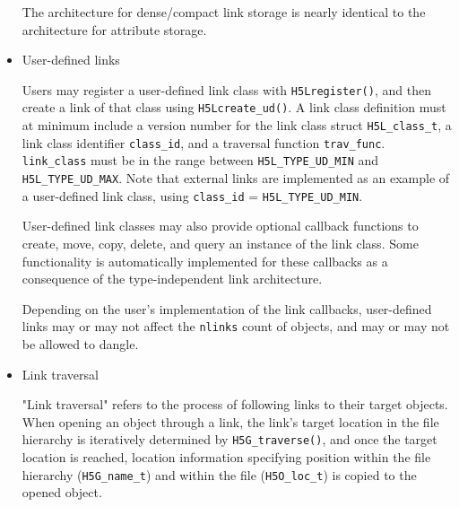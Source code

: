 \begin{itemize}

The architecture for dense/compact link storage is nearly identical to the architecture for attribute storage.

    \item User-defined links

Users may register a user-defined link class with \texttt{H5Lregister()}, and then create a link of that class using \texttt{H5Lcreate\_ud()}. A link class definition must at minimum include a version number for the link class struct \texttt{H5L\_class\_t}, a link class identifier \texttt{class\_id}, and a traversal function \texttt{trav\_func}. \texttt{link\_class} must be in the range between \texttt{H5L\_TYPE\_UD\_MIN} and \texttt{H5L\_TYPE\_UD\_MAX}. Note that external links are implemented as an example of a user-defined link class, using \texttt{class\_id} = \texttt{H5L\_TYPE\_UD\_MIN}.

User-defined link classes may also provide optional callback functions to create, move, copy, delete, and query an instance of the link class. Some functionality is automatically implemented for these callbacks as a consequence of the type-independent link architecture. 

Depending on the user's implementation of the link callbacks, user-defined links may or may not affect the \texttt{nlinks} count of objects, and may or may not be allowed to dangle.

    \item Link traversal

"Link traversal" refers to the process of following links to their target objects. When opening an object through a link, the link's target location in the file hierarchy is iteratively determined by \texttt{H5G\_traverse()}, and once the target location is reached, location information specifying position within the file hierarchy (\texttt{H5G\_name\_t}) and within the file (\texttt{H5O\_loc\_t}) is copied to the opened object.


\end{itemize}
